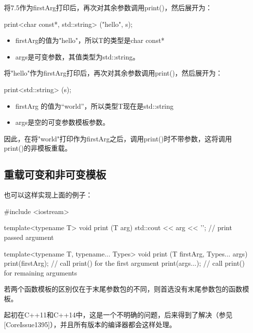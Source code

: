 将7.5作为firstArg打印后，再次对其余参数调用print()，然后展开为：

\begin{cpp}
print<char const*, std::string> ("hello", s);
\end{cpp}

\begin{itemize}
\item 
firstArg的值为"hello"，所以T的类型是char const*

\item 
args是可变参数，其值类型为std::string。
\end{itemize}

将"hello"作为firstArg打印后，再次对其余参数调用print()，然后展开为：

\begin{cpp}
print<std::string> (s);
\end{cpp}

\begin{itemize}
\item 
firstArg 的值为“world”，所以类型T现在是std::string

\item 
args是空的可变参数模板参数。
\end{itemize}

因此，在将"world"打印作为firstArg之后，调用print()时不带参数，这将调用print()的非模板重载。

\subsection{重载可变和非可变模板}

也可以这样实现上面的例子：

\begin{cpp}
#include <iostream>

template<typename T>
void print (T arg)
{
	std::cout << arg << '\n'; // print passed argument
}

template<typename T, typename... Types>
void print (T firstArg, Types... args)
{
	print(firstArg); // call print() for the first argument
	print(args...); // call print() for remaining arguments
}
\end{cpp}

若两个函数模板的区别仅在于末尾参数包的不同，则首选没有末尾参数包的函数模板。

\begin{notice}
起初在C++11和C++14中，这是一个不明确的问题，后来得到了解决（参见[CoreIssue1395]），并且所有版本的编译器都会这样处理。
\end{notice}

